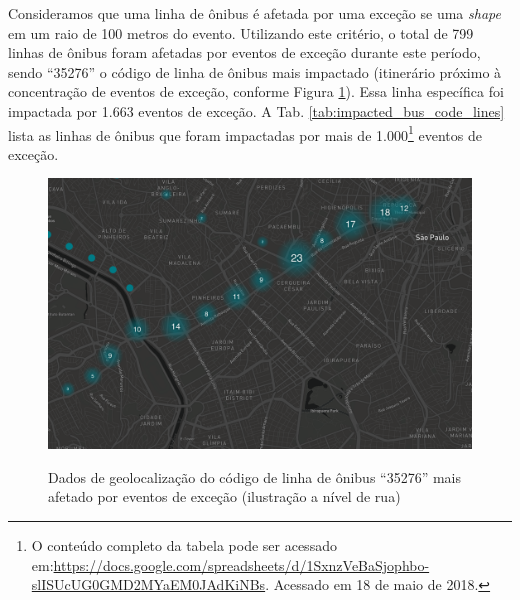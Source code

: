 \documentclass[
	12pt,				%
	oneside,			%
	a4paper,			%
	english,			%
	brazil				%
	]{abntex2ppgsi}
\begin{document}
Consideramos que uma linha de ônibus é afetada por uma exceção se uma \textit{shape} em um raio de 100 metros do evento. Utilizando este critério, o total de 799 linhas de ônibus foram afetadas por eventos de exceção durante este período, sendo ``35276'' o código de linha de ônibus mais impactado (itinerário próximo à concentração de eventos de exceção, conforme Figura \ref{fig:35276_geo}). Essa linha específica foi impactada por 1.663 eventos de exceção. A Tab.  \ref{tab:impacted_bus_code_lines} lista as linhas de ônibus que foram impactadas por mais de 1.000\footnote{O conteúdo completo da tabela pode ser acessado em:\url{https://docs.google.com/spreadsheets/d/1SxnzVeBaSjophbo-slISUcUG0GMD2MYaEM0JAdKiNBs}. Acessado em 18 de maio de 2018.} eventos de exceção.
   
\begin{figure}[!htb]
	\centering
 	  \caption{Dados de geolocalização do código de linha de ônibus ``35276'' mais afetado por eventos de exceção (ilustração a nível de rua)}
		\includegraphics[width=1\linewidth]{images/8700_shapes.png}
	\label{fig:35276_geo}
\end{figure}
\end{document}
